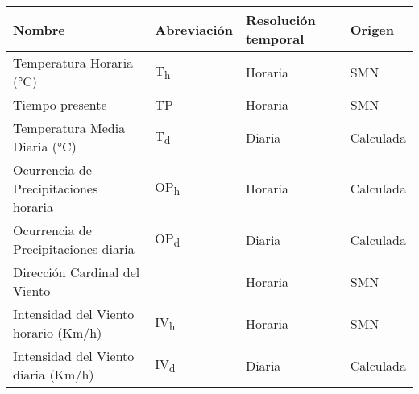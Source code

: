 \begin{table}[ht]
\centering
\begin{tabular}{llll}
  \hline
Nombre & Abreviación & Resolución temporal & Origen \\ 
  \hline
Temperatura Horaria (°C) & T\textsubscript{h} & Horaria & SMN \\ 
  Tiempo presente & TP & Horaria & SMN \\ 
  Temperatura Media Diaria (°C) & T\textsubscript{d} & Diaria & Calculada \\ 
  Ocurrencia de Precipitaciones horaria & OP\textsubscript{h} & Horaria & Calculada \\ 
  Ocurrencia de Precipitaciones diaria & OP\textsubscript{d} & Diaria & Calculada \\ 
  Dirección Cardinal del Viento &  & Horaria & SMN \\ 
  Intensidad del Viento horario (Km/h) & IV\textsubscript{h} & Horaria & SMN \\ 
  Intensidad del Viento diaria (Km/h) & IV\textsubscript{d} & Diaria & Calculada \\ 
   \hline
\end{tabular}
\end{table}
